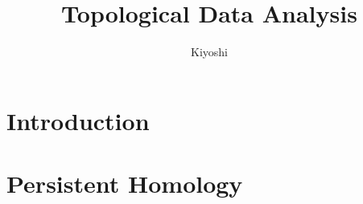\documentclass[]{amsbook}
\title{Topological Data Analysis}
\author{Kiyoshi}
\date{ }
\theoremstyle{definition}
\theoremstyle{definition}
\begin{document}
	\maketitle
	
	\tableofcontents
	
	\section{Introduction}
	
		
		
		
	\section{Persistent Homology}	
	
		
		
		
	


	
	
	
	\printindex
	

	
\end{document}
